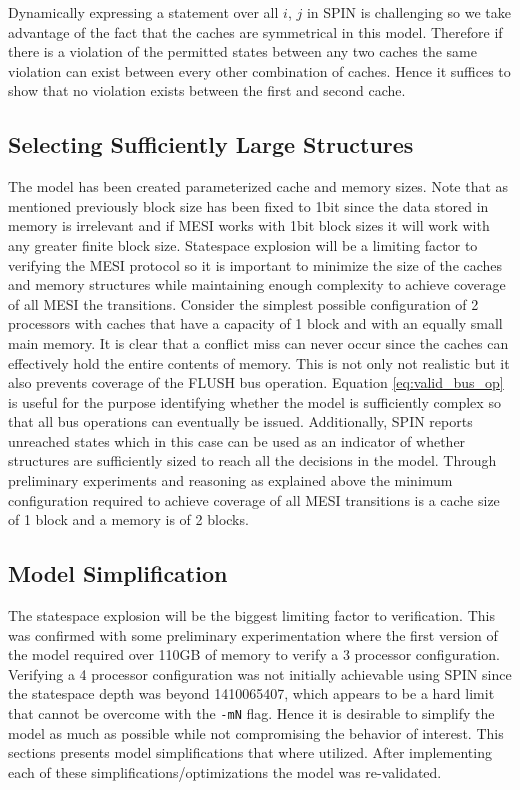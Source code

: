 \documentclass[12pt]{article}
\begin{document}
Dynamically expressing a statement over all $i$, $j$ in SPIN is challenging so we take advantage of the fact that the caches are symmetrical in this model. Therefore if there is a violation of the permitted states between any two caches the same violation can exist between every other combination of caches. Hence it suffices to show that no violation exists between the first and second cache.

\subsection{Selecting Sufficiently Large Structures}

The model has been created parameterized cache and memory sizes. Note that as mentioned previously block size has been fixed to 1bit since the data stored in memory is irrelevant and if MESI works with 1bit block sizes it will work with any greater finite block size. Statespace explosion will be a limiting factor to verifying the MESI protocol so it is important to minimize the size of the caches and memory structures while maintaining enough complexity to achieve coverage of all MESI the transitions. Consider the simplest possible configuration of 2 processors with caches that have a capacity of 1 block and with an equally small main memory. It is clear that a conflict miss can never occur since the caches can effectively hold the entire contents of memory. This is not only not realistic but it also prevents coverage of the FLUSH bus operation. Equation \ref{eq:valid_bus_op} is useful for the purpose identifying whether the model is sufficiently complex so that all bus operations can eventually be issued. Additionally, SPIN reports unreached states which in this case can be used as an indicator of whether structures are sufficiently sized to reach all the decisions in the model. Through preliminary experiments and reasoning as explained above the minimum configuration required to achieve coverage of all MESI transitions is a cache size of 1 block and a memory is of 2 blocks.

\subsection{Model Simplification}

The statespace explosion will be the biggest limiting factor to verification. This was confirmed with some preliminary experimentation where the first version of the model required over 110GB of memory to verify a 3 processor configuration. Verifying a 4 processor configuration was not initially achievable using SPIN since the statespace depth was beyond 1410065407, which appears to be a hard limit that cannot be overcome with the \texttt{-mN} flag. Hence it is desirable to simplify the model as much as possible while not compromising the behavior of interest. This sections presents model simplifications that where utilized. After implementing each of these simplifications/optimizations the model was re-validated.
\end{document}
